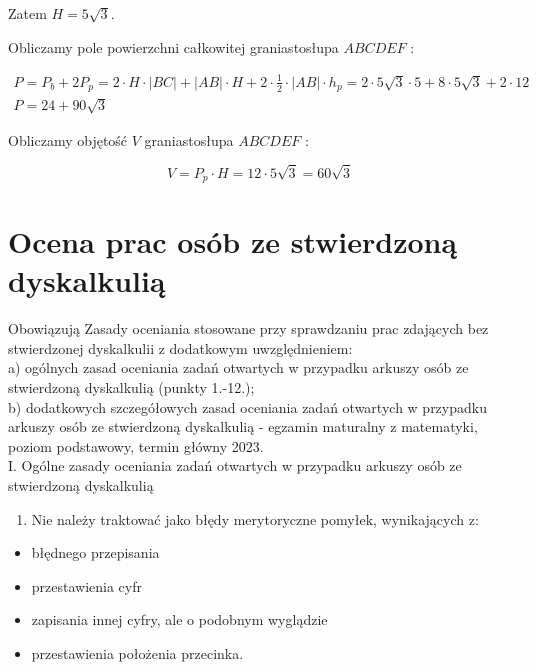 \documentclass[10pt]{article}
\begin{document}
Zatem $H=5 \sqrt{3}$.

Obliczamy pole powierzchni całkowitej graniastosłupa $A B C D E F$ :

$$
\begin{gathered}
P=P_{b}+2 P_{p}=2 \cdot H \cdot|B C|+|A B| \cdot H+2 \cdot \frac{1}{2} \cdot|A B| \cdot h_{p}=2 \cdot 5 \sqrt{3} \cdot 5+8 \cdot 5 \sqrt{3}+2 \cdot 12 \\
P=24+90 \sqrt{3}
\end{gathered}
$$

Obliczamy objętość $V$ graniastosłupa $A B C D E F$ :

$$
V=P_{p} \cdot H=12 \cdot 5 \sqrt{3}=60 \sqrt{3}
$$

\section*{Ocena prac osób ze stwierdzoną dyskalkulią}
Obowiązują Zasady oceniania stosowane przy sprawdzaniu prac zdających bez stwierdzonej dyskalkulii z dodatkowym uwzględnieniem:\\
a) ogólnych zasad oceniania zadań otwartych w przypadku arkuszy osób ze stwierdzoną dyskalkulią (punkty 1.-12.);\\
b) dodatkowych szczegółowych zasad oceniania zadań otwartych w przypadku arkuszy osób ze stwierdzoną dyskalkulią - egzamin maturalny z matematyki, poziom podstawowy, termin główny 2023.\\
I. Ogólne zasady oceniania zadań otwartych w przypadku arkuszy osób ze stwierdzoną dyskalkulią

\begin{enumerate}
  \item Nie należy traktować jako błędy merytoryczne pomyłek, wynikających z:
\end{enumerate}

\begin{itemize}
  \item błędnego przepisania
  \item przestawienia cyfr
  \item zapisania innej cyfry, ale o podobnym wyglądzie
  \item przestawienia położenia przecinka.
\end{itemize}
\end{document}
